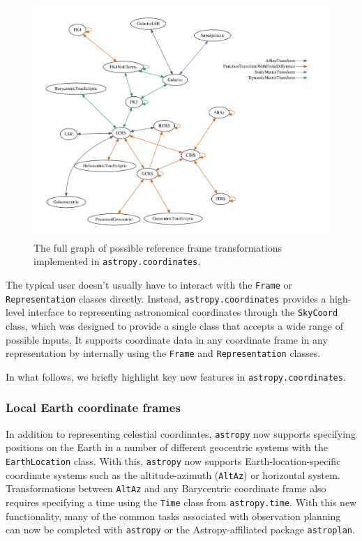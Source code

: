 \documentclass[modern]{aastex61}
\newcommand{\package}[1]{\texttt{#1}\xspace}
\newcommand{\astropy}{Astropy\xspace}
\newcommand{\astropypkg}{\package{astropy}}
\begin{document}
\begin{figure}
\includegraphics[width=\textwidth]{coordinates_graph.pdf}
\caption{%
    The full graph of possible reference frame transformations implemented in
    \texttt{astropy.coordinates}.
    \label{fig:frame-transform-graph}
}
\end{figure}

The typical user doesn't usually have to interact with the \texttt{Frame} or
\texttt{Representation} classes directly.
Instead, \texttt{astropy.coordinates} provides a high-level interface to
representing astronomical coordinates through the \texttt{SkyCoord} class,
which was designed to provide a single class that
accepts a wide range of possible inputs.
It supports coordinate data in any coordinate frame in any representation by
internally using the \texttt{Frame} and \texttt{Representation} classes.

In what follows, we briefly highlight key new features in
\texttt{astropy.coordinates}.

\subsubsection{Local Earth coordinate frames}
In addition to representing celestial
    coordinates, \astropypkg now supports specifying positions on the Earth in
    a number of different geocentric systems with the \texttt{EarthLocation}
    class.
    With this, \astropypkg now supports Earth-location-specific coordinate
    systems such as the altitude-azimuth (\texttt{AltAz}) or horizontal system.
    Transformations between \texttt{AltAz} and any Barycentric coordinate frame
    also requires specifying a time using the \texttt{Time} class from
    \texttt{astropy.time}.
    With this new functionality, many of the common tasks associated with
    observation planning can now be completed with \astropypkg or the
    \astropy-affiliated package \package{astroplan}\citep{astroplan_AAS}.
\end{document}
